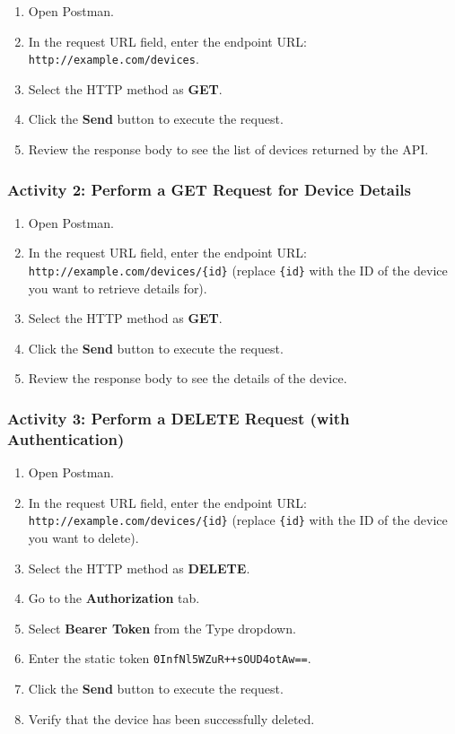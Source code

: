 \documentclass[11pt,a4paper]{article}
\providecommand{\tightlist}{%
  \setlength{\itemsep}{0pt}\setlength{\parskip}{0pt}}
\begin{document}
\begin{enumerate}
\def\labelenumi{\arabic{enumi}.}
\tightlist
\item
  Open Postman.
\item
  In the request URL field, enter the endpoint URL:
  \texttt{http://example.com/devices}.
\item
  Select the HTTP method as \textbf{GET}.
\item
  Click the \textbf{Send} button to execute the request.
\item
  Review the response body to see the list of devices returned by the
  API.
\end{enumerate}

\subsubsection{Activity 2: Perform a GET Request for Device
Details}\label{activity-2-perform-a-get-request-for-device-details}

\begin{enumerate}
\def\labelenumi{\arabic{enumi}.}
\tightlist
\item
  Open Postman.
\item
  In the request URL field, enter the endpoint URL:
  \texttt{http://example.com/devices/\{id\}} (replace \texttt{\{id\}}
  with the ID of the device you want to retrieve details for).
\item
  Select the HTTP method as \textbf{GET}.
\item
  Click the \textbf{Send} button to execute the request.
\item
  Review the response body to see the details of the device.
\end{enumerate}

\subsubsection{Activity 3: Perform a DELETE Request (with
Authentication)}\label{activity-3-perform-a-delete-request-with-authentication}

\begin{enumerate}
\def\labelenumi{\arabic{enumi}.}
\tightlist
\item
  Open Postman.
\item
  In the request URL field, enter the endpoint URL:
  \texttt{http://example.com/devices/\{id\}} (replace \texttt{\{id\}}
  with the ID of the device you want to delete).
\item
  Select the HTTP method as \textbf{DELETE}.
\item
  Go to the \textbf{Authorization} tab.
\item
  Select \textbf{Bearer Token} from the Type dropdown.
\item
  Enter the static token \texttt{0InfNl5WZuR++sOUD4otAw==}.
\item
  Click the \textbf{Send} button to execute the request.
\item
  Verify that the device has been successfully deleted.
\end{enumerate}
\end{document}
